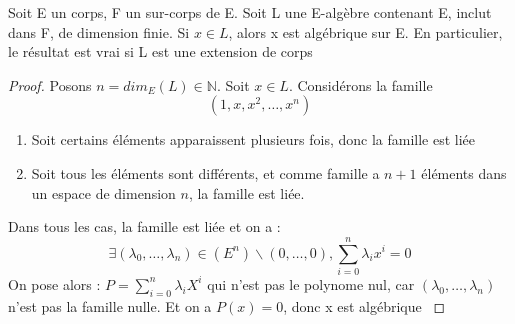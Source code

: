 \documentclass[a4paper,12pt,french,draft]{report}
\begin{document}
			\begin{proposition}
				Soit E un corps, F un sur-corps de E. Soit L une E-algèbre contenant E, inclut dans F, de dimension finie. Si \(x \in L\), alors x est algébrique sur E. En particulier, le résultat est vrai si L est une extension de corps
			\end{proposition}
				\begin{proof}
					Posons \(n = dim_{E}(L) \in \mathbb{N} \). Soit \(x \in L \). Considérons la famille
					\[{}
						\left( 1 , x , x^{2} , \dots , x^{n} \right)
						\]
					\begin{enumerate}
						\item Soit certains éléments apparaissent plusieurs fois, donc la famille est liée
						\item Soit tous les éléments sont différents, et comme famille a \(n+1\) éléments dans un espace de dimension \(n\), la famille est liée.
					\end{enumerate}
					Dans tous les cas, la famille est liée et on a : 
						\[{}
							\exists (\lambda_{0},\dots,\lambda_{n}) \in (E^{n})\backslash {(0,\dots,0)}, \sum_{i = 0}^{n} \lambda_{i}x^{i} = 0
						\]
						On pose alors : \(P = \sum_{i = 0}^{n} \lambda_{i}X^{i} \) qui n'est pas le polynome nul, car \( (\lambda_{0},\dots,\lambda_{n}) \) n'est pas la famille nulle. Et on a \(P(x) = 0 \), donc x est algébrique  \( \)
				\end{proof}
			
\end{document}
